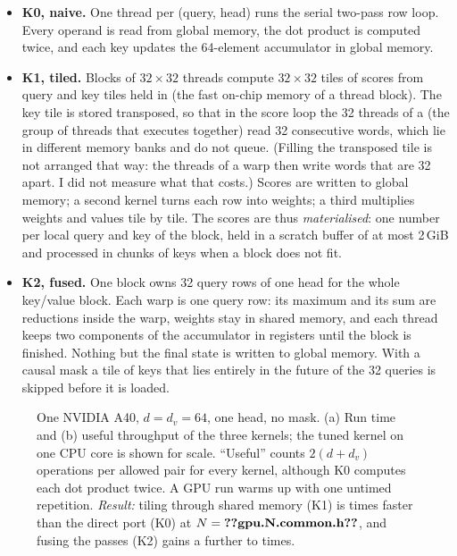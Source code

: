 \begin{itemize}
\item \textbf{K0, naive.} One thread per (query, head) runs the serial two-pass row
loop. Every operand is read from global memory, the dot product is computed twice,
and each key updates the 64-element accumulator in global memory.
\item \textbf{K1, tiled.} Blocks of $32\times32$ threads compute $32\times32$ tiles
of scores from query and key tiles held in  (the fast on-chip
memory of a thread block). The key tile is stored transposed, so that in the score
loop the 32 threads of a  (the group of threads that executes together)
read 32 consecutive words, which lie in different memory banks and do not queue.
(Filling the transposed tile is not arranged that way: the threads of a warp then
write words that are 32 apart. I did not measure what that costs.) Scores are
written to global memory; a second kernel turns each row into weights; a third
multiplies weights and values tile by tile. The scores are thus \emph{materialised}:
one number per local query and key of the block, held in a scratch buffer of at
most 2\,GiB and processed in chunks of keys when a block does not fit.
\item \textbf{K2, fused.} One block owns 32 query rows of one head for the whole
key/value block. Each warp is one query row: its maximum and its sum are reductions
inside the warp, weights stay in shared memory, and each thread keeps two components
of the accumulator in registers until the block is finished. Nothing but the final
state is written to global memory. With a causal mask a tile of keys that lies
entirely in the future of the 32 queries is skipped before it is loaded.
\end{itemize}

\begin{figure}[t]
\centering
{}
\caption{One NVIDIA A40, $d=d_v=64$, one head, no mask. (a) Run time and (b) useful
throughput of the three kernels; the tuned kernel on one CPU core is shown for scale.
``Useful'' counts $2(d+d_v)$ operations per allowed pair for every kernel, although
K0 computes each dot product twice. A GPU run warms up with one untimed repetition.
\emph{Result:} tiling through shared memory (K1) is  times faster than
the direct port (K0) at $N=\n{gpu.N.common.h}$, and fusing the passes (K2) gains a
further  to  times.}
\label{fig:gpuladder}
\end{figure}

